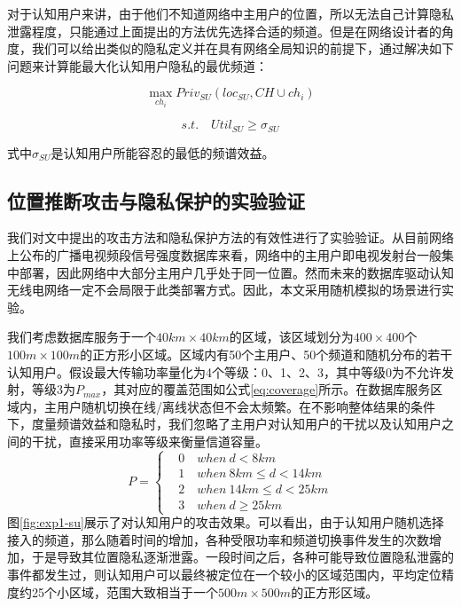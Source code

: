 对于认知用户来讲，由于他们不知道网络中主用户的位置，所以无法自己计算隐私泄露程度，只能通过上面提出的方法优先选择合适的频道。但是在网络设计者的角度，我们可以给出类似的隐私定义并在具有网络全局知识的前提下，通过解决如下问题来计算能最大化认知用户隐私的最优频道：

\begin{equation}
\max_{ch_{i}} Priv_{SU}(loc_{SU},CH \cup ch_{i}) 
\end{equation}

\begin{equation}
s.t. \quad Util_{SU} \geq \sigma_{SU}
\end{equation}

式中$\sigma_{SU}$是认知用户所能容忍的最低的频谱效益。

\subsection{位置推断攻击与隐私保护的实验验证}
我们对文中提出的攻击方法和隐私保护方法的有效性进行了实验验证。从目前网络上公布的广播电视频段信号强度数据库来看，网络中的主用户即电视发射台一般集中部署，因此网络中大部分主用户几乎处于同一位置。然而未来的数据库驱动认知无线电网络一定不会局限于此类部署方式。因此，本文采用随机模拟的场景进行实验。

我们考虑数据库服务于一个$40km \times 40km$的区域，该区域划分为$400 \times 400$个$100m \times 100m$的正方形小区域。区域内有50个主用户、50个频道和随机分布的若干认知用户。假设最大传输功率量化为4个等级：0、1、2、3，其中等级0为不允许发射，等级3为$P_{max}$，其对应的覆盖范围如公式\ref{eq:coverage}所示。在数据库服务区域内，主用户随机切换在线/离线状态但不会太频繁。在不影响整体结果的条件下，度量频谱效益和隐私时，我们忽略了主用户对认知用户的干扰以及认知用户之间的干扰，直接采用功率等级来衡量信道容量。
\begin{equation}\label{eq:coverage}
P=\left\{
\begin{aligned}
&0 \quad when \ d < 8km \\
&1 \quad when \ 8km \leq d < 14km \\
&2 \quad when \ 14km \leq d < 25km \\
&3 \quad when \ d \geq 25km
\end{aligned}
\right.
\end{equation}
图\ref{fig:exp1-su}展示了对认知用户的攻击效果。可以看出，由于认知用户随机选择接入的频道，那么随着时间的增加，各种受限功率和频道切换事件发生的次数增加，于是导致其位置隐私逐渐泄露。一段时间之后，各种可能导致位置隐私泄露的事件都发生过，则认知用户可以最终被定位在一个较小的区域范围内，平均定位精度约25个小区域，范围大致相当于一个$500m \times 500m$的正方形区域。

